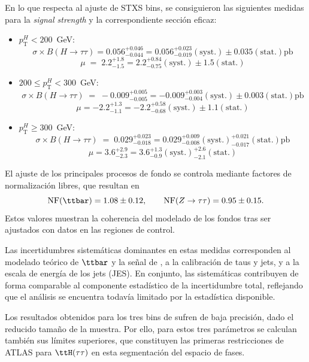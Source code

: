 En lo que respecta al ajuste de STXS bins, se consiguieron las siguientes medidas para la \textit{signal strength} y la correspondiente sección eficaz:
\begin{itemize}
  \small
  \item $p_{\text{T}}^{H} < 200$~GeV:  
  \[
  \sigma \times B(H \to \tau\tau)=0.056^{+0.046}_{-0.044} 
  = 0.056^{+0.023}_{-0.019}(\text{syst.})\pm 0.035(\text{stat.})\text{pb}
  \]
  \[
  \mu \;=\; 2.2^{+1.8}_{-1.5}=2.2^{+0.84}_{-0.75}(\text{syst.})\pm 1.5(\text{stat.})
  \]
  \item $200 \leq p_{\text{T}}^{H} < 300$~GeV:  
  \[
  \sigma \times B(H \to \tau\tau) \;=\; -0.009^{+0.005}_{-0.005} 
  = -0.009^{+0.003}_{-0.004}(\text{syst.})\pm 0.003(\text{stat.}) \text{pb}
  \]
  \[
  \mu=-2.2^{+1.3}_{-1.1}=-2.2^{+0.58}_{-0.68}(\text{syst.})\pm 1.1(\text{stat.})
  \]
  \item $p_{\text{T}}^{H} \geq 300$~GeV:  
  \[
  \sigma \times B(H \to \tau\tau) \;=\; 0.029^{+0.023}_{-0.018} 
  = 0.029^{+0.009}_{-0.008}(\text{syst.})^{+0.021}_{-0.017}(\text{stat.})\text{pb}
  \]
  \[
  \mu=3.6^{+2.9}_{-2.3}=3.6^{+1.3}_{-0.9}(\text{syst.})^{+2.6}_{-2.1}(\text{stat.})
  \]
\end{itemize}

El ajuste de los principales procesos de fondo se controla mediante factores de normalización libres, que resultan en
\[
  \text{NF}(\ttbar) = 1.08 \pm 0.12, \qquad \text{NF}(Z\to\tau\tau) = 0.95 \pm 0.15.
\]
Estos valores muestran la coherencia del modelado de los fondos tras ser ajustados con datos en las regiones de control.

Las incertidumbres sistemáticas dominantes en estas medidas corresponden al modelado teórico de \(\ttbar\) y la señal de \ttH, a la calibración de taus y jets, y a la escala de energía de los jets (JES). En conjunto, las sistemáticas contribuyen de forma comparable al componente estadístico de la incertidumbre total, reflejando que el análisis se encuentra todavía limitado por la estadística disponible. 

Los resultados obtenidos para los tres bins de \pth sufren de baja precisión, dado el reducido tamaño de la muestra. Por ello, para estos tres parámetros se calculan también sus límites superiores, que constituyen las primeras restricciones de ATLAS para \(\ttH(\tau\tau)\) en esta segmentación del espacio de fases.


